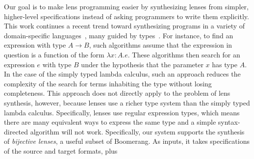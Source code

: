 \documentclass[numbers,10pt,preprint\ifanon ,nocopyrightspace\fi]{sigplanconf}
\begin{document}
Our goal is to make lens programming easier by synthesizing
lenses from simpler, higher-level specifications
instead of asking programmers to write them explicitly.
%
This work continues a recent trend toward synthesizing programs in a variety
of domain-specific languages~\cite[etc.]{yag+:pldi16, osera+:pldi15,
  frankle+:popl16, armando+:pldi16}, many guided by
types~\cite{osera+:pldi15,frankle+:popl16,armando+:pldi16}.  
%
\iffull
{} 
For instance,
to find an expression with type $A \rightarrow B$, such algorithms assume
that the expression in question is a function of the form
$\lambda x{:}A. e$.  These algorithms then search for an expression $e$ with
type $B$ under the hypothesis that the parameter $x$ has type $A$.
%
In
the case of the simply typed lambda calculus, such an approach reduces
the complexity of the search for terms inhabiting the type without
losing completeness.  This approach does not directly apply to the
problem of lens synthesis, however, because
lenses use a richer type system
than the simply typed lambda calculus.
Specifically, lenses use regular expression types, which means 
there are many equivalent ways to express the same type and a simple
syntax-directed algorithm will not work.
\fi
%
%
Specifically, our system supports the synthesis of \emph{bijective lenses}, a useful 
subset of Boomerang.
As inputs, it takes specifications of the source and target formats, plus
\end{document}
